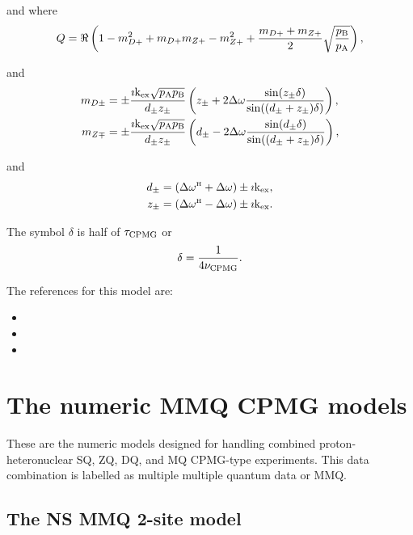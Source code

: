and where
\begin{equation}
    Q = \Re \left( 1 - m_{D+}^2 + m_{D+} m_{Z+} - m_{Z+}^2 + \frac{m_{D+} + m_{Z+}}{2} \sqrt{\frac{p_\textrm{B}}{p_\textrm{A}}} \right),
\end{equation}

and
\begin{align}
    m_{D\pm} &= \pm \frac{\imath\textrm{k}_\textrm{ex}\sqrt{p_\textrm{A}p_\textrm{B}}}{d_\pm z_\pm} \left( z_\pm + 2\Delta\omega \frac{\sin(z_\pm\delta)}{\sin((d_\pm + z_\pm)\delta)} \right), \\
    m_{Z\mp} &= \pm \frac{\imath\textrm{k}_\textrm{ex}\sqrt{p_\textrm{A}p_\textrm{B}}}{d_\pm z_\pm} \left( d_\pm - 2\Delta\omega \frac{\sin(d_\pm\delta)}{\sin((d_\pm + z_\pm)\delta)} \right),
\end{align}

and
\begin{align}
    d_\pm    &= \left( \Delta\omega^{\scriptscriptstyle\mathrm{H}} + \Delta\omega \right) \pm \imath\textrm{k}_\textrm{ex}, \\
    z_\pm    &= \left( \Delta\omega^{\scriptscriptstyle\mathrm{H}} - \Delta\omega \right) \pm \imath\textrm{k}_\textrm{ex}.
\end{align}

The symbol $\delta$ is half of $\tau_\textrm{CPMG}$ or
\begin{equation}
    \delta = \frac{1}{4\nu_\textrm{CPMG}}.
\end{equation}

The references for this model are:
\begin{itemize}
\item {}
\item {}
\item {}
\end{itemize}




\section{The numeric MMQ CPMG models}
\label{sect: dispersion: numeric MMQ CPMG models}

These are the numeric models designed for handling combined proton-heteronuclear SQ, ZQ, DQ, and MQ CPMG-type experiments.
This data combination is labelled as multiple multiple quantum data or MMQ.



\subsection{The NS MMQ 2-site model}
\label{sect: dispersion: NS MMQ 2-site model}

